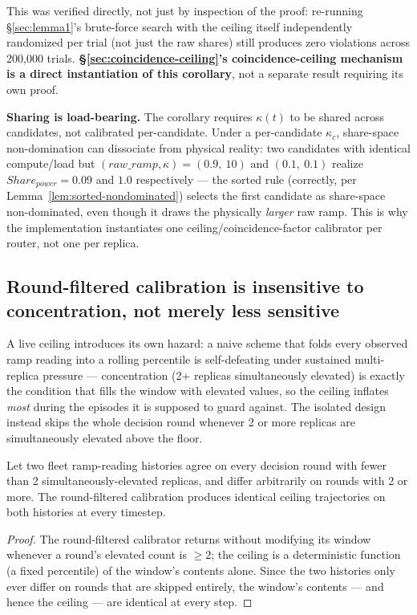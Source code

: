 \documentclass[sigconf,review,anonymous]{acmart}
\begin{document}
This was verified directly, not just by inspection of the proof: re-running
\S\ref{sec:lemma1}'s brute-force search with the ceiling itself independently randomized per
trial (not just the raw shares) still produces zero violations across 200{,}000 trials.
\textbf{\S\ref{sec:coincidence-ceiling}'s coincidence-ceiling mechanism is a direct
instantiation of this corollary}, not a separate result requiring its own proof.

\textbf{Sharing is load-bearing.} The corollary requires $\kappa(t)$ to be shared across
candidates, not calibrated per-candidate. Under a per-candidate $\kappa_c$, share-space
non-domination can dissociate from physical reality: two candidates with identical
compute/load but $(\mathit{raw\_ramp}, \kappa) = (0.9,\ 10)$ and $(0.1,\ 0.1)$ realize
$\mathit{Share_{power}} = 0.09$ and $1.0$ respectively --- the sorted rule (correctly, per
Lemma~\ref{lem:sorted-nondominated}) selects the first candidate as share-space
non-dominated, even though it draws the physically \emph{larger} raw ramp. This is why the
implementation instantiates one ceiling/coincidence-factor calibrator per router, not one per
replica.

\subsection{Round-filtered calibration is insensitive to concentration, not merely less sensitive}
\label{sec:ceiling-boundedness}

A live ceiling introduces its own hazard: a naive scheme that folds every observed ramp reading
into a rolling percentile is self-defeating under sustained multi-replica pressure ---
concentration (2+ replicas simultaneously elevated) is exactly the condition that fills the
window with elevated values, so the ceiling inflates \emph{most} during the episodes it is
supposed to guard against. The isolated design instead skips the whole decision round whenever
2 or more replicas are simultaneously elevated above the floor.

\begin{lemma}
\label{lem:insensitivity}
Let two fleet ramp-reading histories agree on every decision round with fewer than 2
simultaneously-elevated replicas, and differ arbitrarily on rounds with 2 or more. The
round-filtered calibration produces identical ceiling trajectories on both histories at every
timestep.
\end{lemma}

\begin{proof}
The round-filtered calibrator returns without modifying its window whenever a round's elevated
count is $\ge 2$; the ceiling is a deterministic function (a fixed percentile) of the window's
contents alone. Since the two histories only ever differ on rounds that are skipped entirely,
the window's contents --- and hence the ceiling --- are identical at every step.
\end{proof}
\end{document}
